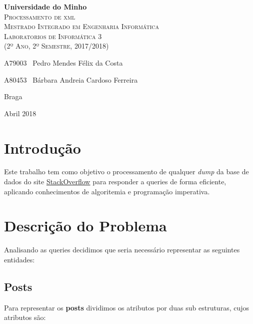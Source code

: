 \documentclass[10pt,a4paper]{article}
\begin{document}
\begin{titlepage}
    \center
    {\huge {\bf Universidade do Minho}}\\[0.4cm]
    \vspace{3.0cm}
    \textsc{\huge{Processamento de xml}}\\[0.5cm] %
    \vspace{3.0cm}
    \textsc{\huge{Mestrado Integrado em Engenharia Informática}}\\[0.5cm]
    \vspace{2.0cm}
    \textsc{Laboratorios de Informática 3}\\[0.5cm]
    \textsc{(2º Ano, 2º Semestre, 2017/2018)}\\[0.5cm]
    \vspace{1.5cm}
    \begin{flushleft}
        A79003 \,\,\,Pedro Mendes Félix da Costa
        \vspace{0.2cm}

        A80453 \,\,\,Bárbara Andreia Cardoso Ferreira
    \end{flushleft}
        \vspace{1cm}
    \begin{flushright}
        Braga

        Abril 2018
    \end{flushright}

\end{titlepage}

\tableofcontents
\clearpage

\section{Introdução}
    Este trabalho tem como objetivo o processamento de qualquer \textit{dump}
    da base de dados do site \href{www.stackoverflow.com}{StackOverflow} para
    responder a queries de forma eficiente, aplicando conhecimentos de
    algoritemia e programação imperativa.

\section{Descrição do Problema}
    Analisando as queries decidimos que seria necessário representar
    as seguintes entidades:

    \subsection{Posts}
    Para representar os \textbf{posts} dividimos os atributos por duas
     sub estruturas, cujos atributos são:
\end{document}
